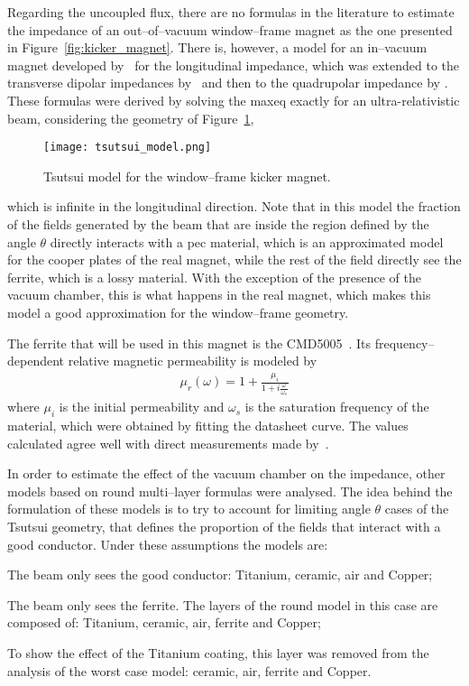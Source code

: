     Regarding the uncoupled flux, there are no formulas in the literature to estimate the impedance of an out--of--vacuum window--frame magnet as the one presented in Figure~\ref{fig:kicker_magnet}. There is, however, a model for an in--vacuum magnet developed by~ for the longitudinal impedance, which was extended to the transverse dipolar impedances by~ and then to the quadrupolar impedance by . These formulas were derived by solving the \gls{maxeq} exactly for an ultra-relativistic beam, considering the geometry of Figure~\ref{fig:tsutsui_model},
    \begin{figure}
        \centering
        \texttt{[image: tsutsui\_model.png]}
        \caption{Tsutsui model for the window--frame kicker magnet.}
        \label{fig:tsutsui_model}
    \end{figure}
    which is infinite in the longitudinal direction. Note that in this model the fraction of the fields generated by the beam that are inside the region defined by the angle $\theta$ directly interacts with a \gls{pec} material, which is an approximated model for the cooper plates of the real magnet, while the rest of the field directly see the ferrite, which is a lossy material. With the exception of the presence of the vacuum chamber, this is what happens in the real magnet, which makes this model a good approximation for the window--frame geometry.

    The ferrite that will be used in this magnet is the CMD5005~\cite{CeramicMagnets2017}. Its frequency--dependent relative magnetic permeability is modeled by
    \begin{align}
        \mu_r(\omega) = 1 + \frac{\mu_i}{1+i\frac{\omega}{\omega_s}}
    \end{align}
    where $\mu_i$ is the initial permeability and $\omega_s$ is the saturation frequency of the material, which were obtained by fitting the datasheet curve. The values calculated agree well with direct measurements made by~.

    In order to estimate the effect of the vacuum chamber on the impedance, other models based on round multi--layer formulas were analysed. The idea behind the formulation of these models is to try to account for limiting angle $\theta$ cases of the Tsutsui geometry, that defines the proportion of the fields that interact with a good conductor. Under these assumptions the models are:
    \begin{description}[align=left]
        \item[Best case (B):] The beam only sees the good conductor: Titanium, ceramic, air and Copper;
        \item[Worst case (W):] The beam only sees the ferrite. The layers of the round model in this case are composed of: Titanium, ceramic, air, ferrite and Copper;
        \item[No Coating (NC):] To show the effect of the Titanium coating, this layer was removed from the analysis of the worst case model: ceramic, air, ferrite and Copper.
    \end{description}

